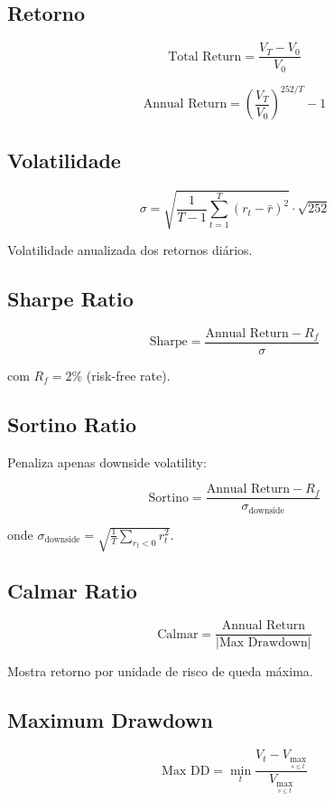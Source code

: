 \documentclass[12pt,a4paper]{article}
\begin{document}
\subsection{Retorno}

\[
\text{Total Return} = \frac{V_T - V_0}{V_0}
\]

\[
\text{Annual Return} = \left(\frac{V_T}{V_0}\right)^{252/T} - 1
\]

\subsection{Volatilidade}

\[
\sigma = \sqrt{\frac{1}{T-1} \sum_{t=1}^{T} (r_t - \bar{r})^2} \cdot \sqrt{252}
\]

Volatilidade anualizada dos retornos diários.

\subsection{Sharpe Ratio}

\[
\text{Sharpe} = \frac{\text{Annual Return} - R_f}{\sigma} 
\]

com $R_f = 2\%$ (risk-free rate).

\subsection{Sortino Ratio}

Penaliza apenas downside volatility:

\[
\text{Sortino} = \frac{\text{Annual Return} - R_f}{\sigma_{\text{downside}}}
\]

onde $\sigma_{\text{downside}} = \sqrt{\frac{1}{T}\sum_{r_t < 0} r_t^2}$.

\subsection{Calmar Ratio}

\[
\text{Calmar} = \frac{\text{Annual Return}}{|\text{Max Drawdown}|}
\]

Mostra retorno por unidade de risco de queda máxima.

\subsection{Maximum Drawdown}

\[
\text{Max DD} = \min_t \frac{V_t - V_{\max_{s \leq t}}}{V_{\max_{s \leq t}}}
\]
\end{document}
